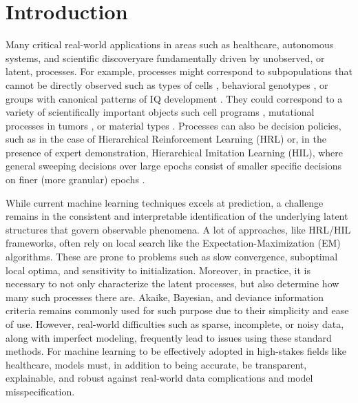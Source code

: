 \chapter{Introduction}
Many critical real-world applications in areas such as healthcare, autonomous systems, and scientific discoveryare fundamentally driven by unobserved, or latent, processes. 
For example, processes might correspond to subpopulations that cannot be directly observed such as
types of cells \citep{Gorsky:2020,Prabhakaran:2016}, behavioral genotypes \citep{Stevens:2019}, or
groups with canonical patterns of IQ development \citep{Bauer:2007}.
They could correspond to a variety of scientifically important objects such cell programs \citep{Kotliar_Identify_Cell_Idendity_Activity_NMF_2019,Buettner_FscLVM_ScalableVersatile_FA_2017,Risso_General_Flexible_Signal_Extract_2018},
mutational processes in tumors %
\citep{Levitin_DeNovo_Gene_Signature_Identification_2019,Kinker_Pan_Cancer_2020,Seplyarskiy_PopulationSequencingData_2021},
or material types
\citep{Fevotte_NonlinearHyperspectralUnmixing_2015,Rajabi_SpectralUnmixingHyperspectral_2015}.
Processes can also be decision policies, such as in the case of 
Hierarchical Reinforcement Learning (HRL) or, in the presence of expert demonstration, Hierarchical Imitation Learning (HIL), where
general sweeping decisions over large epochs consist of  
smaller specific decisions on finer (more granular) epochs \citep{SUTTON1999181, Barto2003}. 

While current machine learning techniques excels at prediction, a challenge remains in the 
consistent and interpretable identification of the underlying latent structures that 
govern observable phenomena. A lot of approaches, like HRL/HIL frameworks, 
often rely on local search like the Expectation-Maximization (EM) algorithms. These are prone to problems such as 
slow convergence, suboptimal local optima, and sensitivity to initialization. 
Moreover, in practice, it is necessary to not only characterize
the latent processes, but also determine how many such processes there are. Akaike, Bayesian, and deviance information criteria \citep{Akaike:1974,Schwarz:1978,Spiegelhalter:2002} remains commonly used for such purpose due to their simplicity and ease of use. 
However, real-world difficulties such as sparse, incomplete, or noisy data, along with imperfect modeling, 
frequently lead to issues using these standard methods. For machine learning to be effectively adopted in high-stakes fields like healthcare, models must, in addition to being accurate, be transparent, explainable, and robust against real-world data complications and model misspecification.


